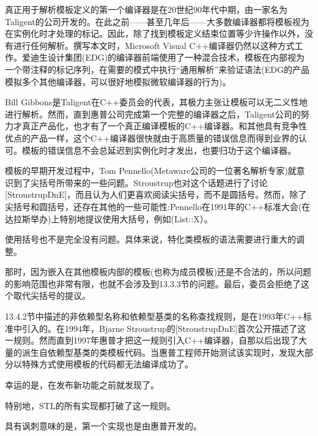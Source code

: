 真正用于解析模板定义的第一个编译器是在20世纪90年代中期，由一家名为Taligent的公司开发的。在此之前——甚至几年后——大多数编译器都将模板视为在实例化时才处理的标记。因此，除了找到模板定义结束位置等少许操作以外，没有进行任何解析。撰写本文时，Microsoft Visual C++编译器仍然以这种方式工作。爱迪生设计集团(EDG)的编译器前端使用了一种混合技术，模板在内部视为一个带注释的标记序列，在需要的模式中执行“通用解析”来验证语法(EDG的产品模拟多个其他编译器，可以很好地模拟微软编译器的行为)。

Bill Gibbons是Taligent在C++委员会的代表，其极力主张让模板可以无二义性地进行解析。然而，直到惠普公司完成第一个完整的编译器之后，Taligent公司的努力才真正产品化，也才有了一个真正编译模板的C++编译器。和其他具有竞争性优点的产品一样，这个C++编译器很快就由于高质量的错误信息而得到业界的认可。模板的错误信息不会总延迟到实例化时才发出，也要归功于这个编译器。

模板的早期开发过程中，Tom Pennello(Metaware公司的一位著名解析专家)就意识到了尖括号所带来的一些问题。Stroustrup也对这个话题进行了讨论[StroustrupDnE]，而且认为人们更喜欢阅读尖括号，而不是圆括号。然而，除了尖括号和圆括号，还存在其他的一些可能性:Pennello在1991年的C++标准大会(在达拉斯举办)上特别地提议使用大括号，例如(List{::X}）。

\begin{tcolorbox}[colback=webgreen!5!white,colframe=webgreen!75!black]
\hspace*{0.75cm}使用括号也不是完全没有问题。具体来说，特化类模板的语法需要进行重大的调整。
\end{tcolorbox}

那时，因为嵌入在其他模板内部的模板(也称为成员模板)还是不合法的，所以问题的影响范围也非常有限，也就不会涉及到13.3.3节的问题。最后，委员会拒绝了这个取代尖括号的提议。

13.4.2节中描述的非依赖型名称和依赖型基类的名称查找规则，是在1993年C++标准中引入的。在1994年，Bjarne Stroustrup的[StroustrupDnE]首次公开描述了这一规则。然而直到1997年惠普才把这一规则引入C++编译器，自那以后出现了大量的派生自依赖型基类的类模板代码。当惠普工程师开始测试该实现时，发现大部分以特殊方式使用模板的代码都无法编译成功了。

\begin{tcolorbox}[colback=webgreen!5!white,colframe=webgreen!75!black]
\hspace*{0.75cm}幸运的是，在发布新功能之前就发现了。
\end{tcolorbox}

特别地，STL的所有实现都打破了这一规则。

\begin{tcolorbox}[colback=webgreen!5!white,colframe=webgreen!75!black]
\hspace*{0.75cm}具有讽刺意味的是，第一个实现也是由惠普开发的。
\end{tcolorbox}

